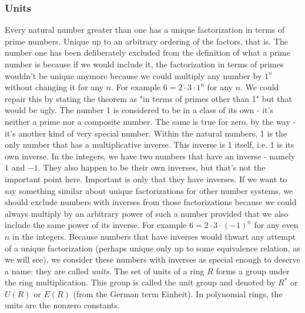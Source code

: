 

\subsubsection{Units}
Every natural number greater than one has a unique factorization in terms of prime numbers. Unique up to an arbitrary ordering of the factors, that is. The number one has been deliberately excluded from the definition of what a prime number is because if we would include it, the factorization in terms of primes wouldn't be unique anymore because we could multiply any number by $1^n$ without changing it for any $n$. For example $6 = 2 \cdot 3 \cdot 1^n$ for any $n$. We could repair this by stating the theorem as "in terms of primes other than 1" but that would be ugly. The number 1 is considered to be in a class of its own - it's neither a prime nor a composite number. The same is true for zero, by the way - it's another kind of very special number. Within the natural numbers, 1 is the only number that has a multiplicative inverse. This inverse is 1 itself, i.e. 1 is its own inverse. In the integers, we have two numbers that have an inverse - namely $1$ and $-1$. They also happen to be their own inverses, but that's not the important point here. Important is only that they have inverses. If we want to say something similar about unique factorizations for other number systems, we should exclude numbers with inverses from those factorizations because we could always multiply by an arbitrary power of such a number provided that we also include the same power of its inverse. For example $6 = 2 \cdot 3 \cdot (-1)^n$ for any even $n$ in the integers. Because numbers that have inverses would thwart any attempt of a unique factorization (perhaps unique only up to some equivalence relation, as we will see), we consider these numbers with inverses as special enough to deserve a name: they are called \emph{units}. The set of units of a ring $R$ forms a group under the ring multiplication. This group is called the unit group and denoted by $R^*$ or $U(R)$ or $E(R)$ (from the German term Einheit). In polynomial rings, the units are the nonzero constants. 

